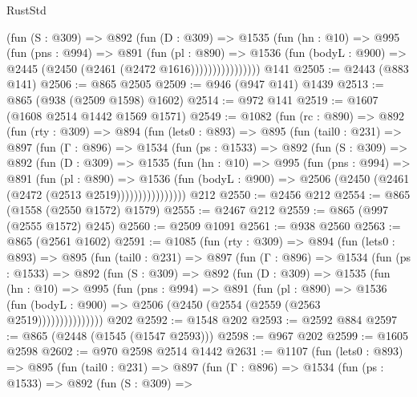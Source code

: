 \begin{lexlean}{RustStd}
\begin{coremodule}
                  (fun (S : @309) =>
                  @892
                    (fun (D : @309) =>
                    @1535
                      (fun (hn : @10) =>
                      @995
                        (fun (pns : @994) =>
                        @891
                          (fun (pl : @890) =>
                          @1536
                            (fun (bodyL : @900) => @2445 (@2450 (@2461 (@2472 @1616))))))))))))))))
    @141
@2505 := @2443 (@883 @141)
@2506 := @865 @2505
@2509 := @946 (@947 @141) @1439
@2513 := @865 (@938 (@2509 @1598) @1602)
@2514 := @972 @141
@2519 := @1607 (@1608 @2514 @1442 @1569 @1571)
@2549 := @1082
    (fun (rc : @890) =>
    @892
      (fun (rty : @309) =>
      @894
        (fun (lets0 : @893) =>
        @895
          (fun (tail0 : @231) =>
          @897
            (fun (Γ : @896) =>
            @1534
              (fun (ps : @1533) =>
              @892
                (fun (S : @309) =>
                @892
                  (fun (D : @309) =>
                  @1535
                    (fun (hn : @10) =>
                    @995
                      (fun (pns : @994) =>
                      @891
                        (fun (pl : @890) =>
                        @1536
                          (fun (bodyL : @900) =>
                          @2506 (@2450 (@2461 (@2472 (@2513 @2519))))))))))))))))
    @212
@2550 := @2456 @212
@2554 := @865 (@1558 (@2550 @1572) @1579)
@2555 := @2467 @212
@2559 := @865 (@997 (@2555 @1572) @245)
@2560 := @2509 @1091
@2561 := @938 @2560
@2563 := @865 (@2561 @1602)
@2591 := @1085
    (fun (rty : @309) =>
    @894
      (fun (lets0 : @893) =>
      @895
        (fun (tail0 : @231) =>
        @897
          (fun (Γ : @896) =>
          @1534
            (fun (ps : @1533) =>
            @892
              (fun (S : @309) =>
              @892
                (fun (D : @309) =>
                @1535
                  (fun (hn : @10) =>
                  @995
                    (fun (pns : @994) =>
                    @891
                      (fun (pl : @890) =>
                      @1536
                        (fun (bodyL : @900) =>
                        @2506 (@2450 (@2554 (@2559 (@2563 @2519)))))))))))))))
    @202
@2592 := @1548 @202
@2593 := @2592 @884
@2597 := @865 (@2448 (@1545 (@1547 @2593)))
@2598 := @967 @202
@2599 := @1605 @2598
@2602 := @970 @2598 @2514 @1442
@2631 := @1107
    (fun (lets0 : @893) =>
    @895
      (fun (tail0 : @231) =>
      @897
        (fun (Γ : @896) =>
        @1534
          (fun (ps : @1533) =>
          @892
            (fun (S : @309) =>

\end{coremodule}
\end{lexlean}
